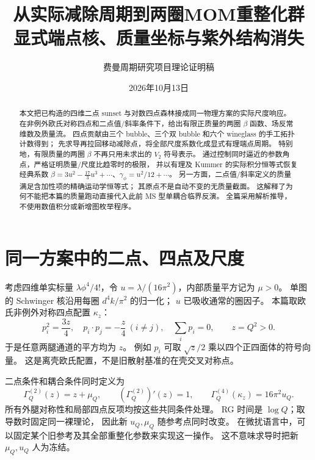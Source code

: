 \documentclass[11pt,a4paper]{ctexart}
\title{从实际减除周期到两圈MOM重整化群\\[4pt]
\large 显式端点核、质量坐标与紫外结构消失}
\author{费曼周期研究项目\quad 理论证明稿}
\date{2026年10月13日}
\theoremstyle{cnplain}
\theoremstyle{remark}\newtheorem{remark}[theorem]{注}
\begin{document}
\maketitle
\begin{abstract}
本文把已构造的四维二点 sunset 与对数四点森林接成同一物理方案的实际尺度响应。
在非例外欧氏对称四点和二点值/斜率条件下，给出有限正质量的两圈
$\beta$ 函数、场反常维数及质量流。
四点贡献由三个 bubble、三个双 bubble 和六个 wineglass 的手工拓扑计数得到；
先求导再拉回移动减除点，将全部尺度系数化成显式有理端点周期。
特别地，有限质量的两圈 $\beta$ 不再只用未求出的 $V_2$ 符号表示。
通过控制同时逼近的参数角点，严格证明质量/尺度比趋零时的极限，
并以有理及 Kummer 的实际积分恒等式恢复经典系数
$\beta=3u^2-\frac{17}{3}u^3+\cdots$、$\gamma_\phi=u^2/12+\cdots$。
另一方面，二点值/斜率定义的质量满足含加性项的精确运动学恒等式；
其原点不是自动不变的无质量截面。
这解释了为何不能把本篇的质量跑动直接代入此前 MS 型单耦合临界反演。
全篇采用解析推导，不使用数值积分或新增图枚举程序。
\end{abstract}

\section{同一方案中的二点、四点及尺度}
考虑四维单实标量 $\lambda\phi^4/4!$，令
$u=\lambda/(16\pi^2)$，内部质量平方记为 $\mu>0$。
单图的 Schwinger 核沿用每圈 $d^4k/\pi^2$ 的归一化；
$u$ 已吸收通常的圈因子。
本篇取欧氏非例外对称四点配置 $\kappa_z$：
\begin{equation}\label{eq:symmetric}
 p_i^2=\frac{3z}{4},\quad p_i\cdot p_j=-\frac z4\ (i\ne j),
 \quad \sum_i p_i=0,\qquad z=Q^2>0.
\end{equation}
于是任意两腿通道的平方均为 $z$。
例如 $p_i$ 可取 $\sqrt z/2$ 乘以四个正四面体的符号向量。
这是离壳欧氏配置，不是旧散射基准的在壳交叉对称点。

二点条件和耦合条件同时定义为
\begin{equation}\label{eq:conditions}
 \Gamma_Q^{(2)}(z)=z+\mu_Q,\qquad
 (\Gamma_Q^{(2)})'(z)=1,\qquad
 \Gamma_Q^{(4)}(\kappa_z)=16\pi^2u_Q.
\end{equation}
所有外腿对称性和局部四点反项均按这些共同条件处理。
RG 时间是 $\log Q$；取导数时固定同一裸理论，
因此新 $u_Q,\mu_Q$ 随参考点同时改变。
在微扰语言中，可以固定某个旧参考及其全部重整化参数来实现这一操作。
这不意味求导时把新 $\mu_Q,u_Q$ 人为冻结。
\end{document}
